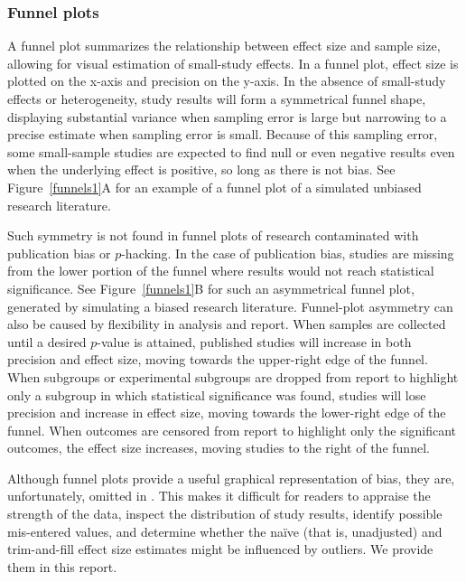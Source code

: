 \documentclass[man]{apa6}
\begin{document}
\subsubsection{Funnel plots}
A funnel plot summarizes the relationship between effect size and sample size, allowing for visual estimation of small-study effects. In a funnel plot, effect size is plotted on the x-axis and precision on the y-axis. In the absence of small-study effects or heterogeneity, study results will form a symmetrical funnel shape, displaying substantial variance when sampling error is large but narrowing to a precise estimate when sampling error is small. Because of this sampling error, some small-sample studies are expected to find null or even negative results even when the underlying effect is positive, so long as there is not bias. See Figure~\ref{funnels1}A for an example of a funnel plot of a simulated unbiased research literature.

Such symmetry is not found in funnel plots of research contaminated with publication bias or $p$-hacking.  In the case of publication bias, studies are missing from the lower portion of the funnel where results would not reach statistical significance. See Figure~\ref{funnels1}B for such an asymmetrical funnel plot, generated by simulating a biased research literature. Funnel-plot asymmetry can also be caused by flexibility in analysis and report. When samples are collected until a desired $p$-value is attained, published studies will increase in both precision and effect size, moving towards the upper-right edge of the funnel. When subgroups or experimental subgroups are dropped from report to highlight only a subgroup in which statistical significance was found, studies will lose precision and increase in effect size, moving towards the lower-right edge of the funnel. When outcomes are censored from report to highlight only the significant outcomes, the effect size increases, moving studies to the right of the funnel.   %

Although funnel plots provide a useful graphical representation of bias, they are, unfortunately, omitted in \citet{Anderson:etal:2010}.  This makes it difficult for readers to appraise the strength of the data, inspect the distribution of study results, identify possible mis-entered values, and determine whether the na{\"i}ve (that is, unadjusted) and trim-and-fill effect size estimates might be influenced by outliers. We provide them in this report. 
\end{document}
